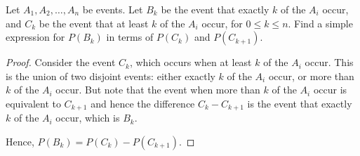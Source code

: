 \begin{exercise}{46} Let $A_1, A_2, \dots , A_n$ be events. Let $B_k$ be the event that exactly $k$ of the $A_i$ occur, and
$C_k$ be the event that at least $k$ of the $A_i$ occur, for $0 \leq k \leq n$. Find a simple expression
for $P (B_k)$ in terms of $P (C_k )$ and $P (C_{k+1})$.
\end{exercise}

\begin{proof}
    Consider the event $C_k$, which occurs when at least $k$ of the $A_i$ occur. This is the union of two disjoint events: either exactly $k$ of the $A_i$ occur, or more than $k$ of the $A_i$ occur. But note that the event when  more than $k$ of the $A_i$ occur is equivalent to $C_{k+1}$ and hence the difference $C_{k} - C_{k+1}$ is the event that exactly $k$ of the $A_i$ occur, which is $B_k$.

    Hence, $P(B_k) = P(C_k) - P(C_{k+1})$.
\end{proof}

